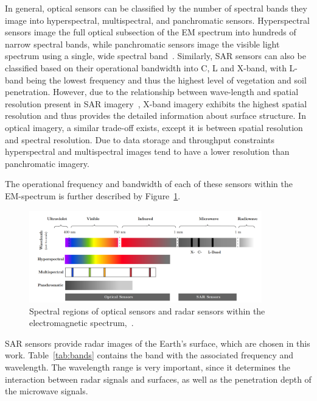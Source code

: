 In general, optical sensors can be classified by the number of spectral bands they image into hyperspectral, multispectral, and panchromatic sensors. 
Hyperspectral sensors image the full optical subsection of the EM spectrum into hundreds of narrow spectral bands, while panchromatic sensors image the visible light spectrum using a single, wide spectral band~\citep{Sara2021}.
Similarly, SAR sensors can also be classified based on their operational bandwidth into C, L and X-band, with L-band being the lowest frequency and thus the highest level of vegetation and soil penetration.
However, due to the relationship between wave-length and spatial resolution present in SAR imagery~\citep{cumming2005digital}, X-band imagery exhibits the highest spatial resolution and thus provides the detailed information about surface structure. 
In optical imagery, a similar trade-off exists, except it is between spatial resolution and spectral resolution. 
Due to data storage and throughput constraints hyperspectral and multispectral images tend to have a lower resolution than panchromatic imagery.

The operational frequency and bandwidth of each of these sensors within the EM-spectrum is further described by Figure~\ref{fig:EM-spectrum}.
	\begin{figure}[H]
    \centering
    \includegraphics[width=0.9\textwidth]{../../Images/PNG/sensor.png}
    \caption[Spectral regions of sensors within the electromagnetic spectrum.]{Spectral regions of optical sensors and radar sensors within the electromagnetic spectrum,~\citep{zhang2022synthetic}.}
    \label{fig:EM-spectrum}
\end{figure}
SAR sensors provide radar images of the Earth’s surface, which are chosen in this work.
Table~\ref{tab:bands} contains the band with the associated frequency and wavelength. 
The wavelength range is very important, since it determines the interaction between radar signals and surfaces, as well as the penetration depth of the microwave
signals.

